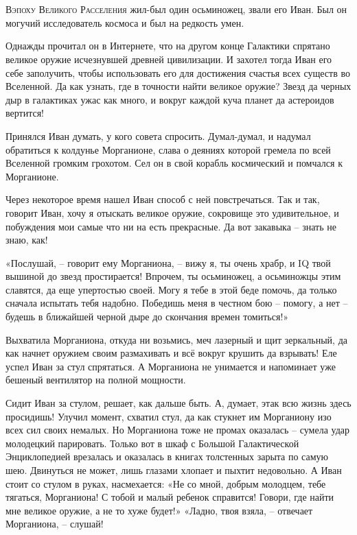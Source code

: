 \documentclass[ebook,oneside,final,openright]{memoir}
\begin{document}
\chapter{}
 \lettrine{В}{эпоху Великого Расселения} жил-был один осьминожец, звали его Иван. Был он могучий исследователь космоса и был на редкость умен.\par
\par
Однажды прочитал он в Интернете, что на другом конце Галактики спрятано великое оружие исчезнувшей древней цивилизации. И захотел тогда Иван его себе заполучить, чтобы использовать его для достижения счастья всех существ во Вселенной. Да как узнать, где в точности найти великое оружие? Звезд да черных дыр в галактиках ужас как много, и вокруг каждой куча планет да астероидов вертится!\par
\par
Принялся Иван думать, у кого совета спросить. Думал-думал, и надумал обратиться к колдунье Морганионе, слава о деяниях которой гремела по всей Вселенной громким грохотом. Сел он в свой корабль космический и помчался к Морганионе.\par
\par
Через некоторое время нашел Иван способ с ней повстречаться. Так и так, говорит Иван, хочу я отыскать великое оружие, сокровище это удивительное, и побуждения мои самые что ни на есть прекрасные. Да вот закавыка – знать не знаю, как!\par
\par
«Послушай, – говорит ему Морганиона, – вижу я, ты очень храбр, и IQ твой вышиной до звезд простирается! Впрочем, ты осьминожец, а осьминожцы этим славятся, да еще упертостью своей. Могу я тебе в этой беде помочь, да только сначала испытать тебя надобно. Победишь меня в честном бою – помогу, а нет – будешь в ближайшей черной дыре до скончания времен томиться!» \par
\par
Выхватила Морганиона, откуда ни возьмись, меч лазерный и щит зеркальный, да как начнет оружием своим размахивать и всё вокруг крушить да взрывать! Еле успел Иван за стул спрятаться. А Морганиона не унимается и напоминает уже бешеный вентилятор на полной мощности. \par
\par
Сидит Иван за стулом, решает, как дальше быть. А, думает, этак всю жизнь здесь просидишь! Улучил момент, схватил стул, да как стукнет им Морганиону изо всех сил своих немалых. Но Морганиона тоже не промах оказалась – сумела удар молодецкий парировать. Только вот в шкаф с Большой Галактической Энциклопедией врезалась и оказалась в книгах толстенных зарыта по самую шею. Двинуться не может, лишь глазами хлопает и пыхтит недовольно. А Иван стоит со стулом в руках, насмехается: «Не со мной, добрым молодцем, тебе тягаться, Морганиона! С тобой и малый ребенок справится! Говори, где найти мне великое оружие, а не то хуже будет!» «Ладно, твоя взяла, – отвечает Морганиона, – слушай!\par
\end{document}
